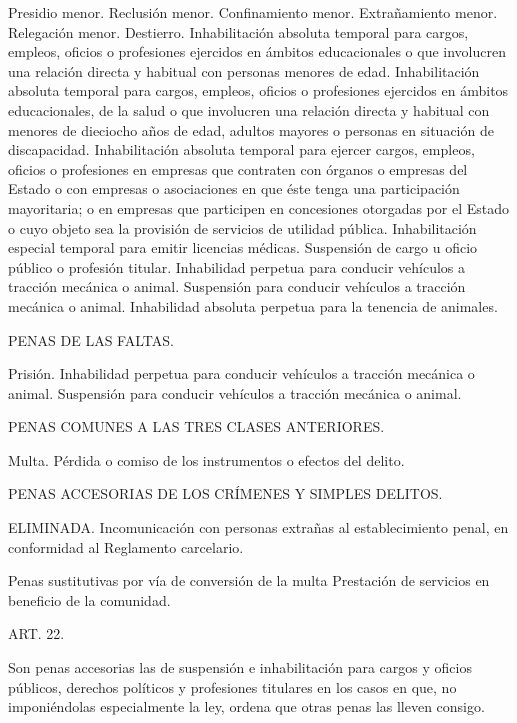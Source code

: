     Presidio menor.
    Reclusión menor.
    Confinamiento menor.
    Extrañamiento menor.
    Relegación menor.
    Destierro.
    Inhabilitación absoluta temporal para cargos, empleos, oficios o profesiones ejercidos en ámbitos educacionales o que involucren una relación directa y habitual con personas menores de edad.
    Inhabilitación absoluta temporal para cargos, empleos, oficios o profesiones ejercidos en ámbitos educacionales, de la salud o que involucren una relación directa y habitual con menores de dieciocho años de edad, adultos mayores o personas en situación de discapacidad.
    Inhabilitación absoluta temporal para ejercer cargos, empleos, oficios o profesiones en empresas que contraten con órganos o empresas del Estado o con empresas o asociaciones en que éste tenga una participación mayoritaria; o en empresas que participen en concesiones otorgadas por el Estado o cuyo objeto sea la provisión de servicios de utilidad pública.
    Inhabilitación especial temporal para emitir licencias médicas.
    Suspensión de cargo u oficio público o profesión titular.
    Inhabilidad perpetua para conducir vehículos a tracción mecánica o animal.
    Suspensión para conducir vehículos a tracción mecánica o animal.
    Inhabilidad absoluta perpetua para la tenencia de animales.

    PENAS DE LAS FALTAS.

    Prisión.
    Inhabilidad perpetua para conducir vehículos a tracción mecánica o animal.
    Suspensión para conducir vehículos a tracción mecánica o animal.

    PENAS COMUNES A LAS TRES CLASES ANTERIORES.

    Multa.
    Pérdida o comiso de los instrumentos o efectos del delito.

    PENAS ACCESORIAS DE LOS CRÍMENES Y SIMPLES DELITOS.

    ELIMINADA.
    Incomunicación con personas extrañas al establecimiento penal, en conformidad al Reglamento carcelario.

    Penas sustitutivas por vía de conversión de la multa
    Prestación de servicios en beneficio de la comunidad.








    ART. 22.

    Son penas accesorias las de suspensión e inhabilitación para cargos y oficios públicos, derechos políticos y profesiones titulares en los casos en que, no imponiéndolas especialmente la ley, ordena que otras penas las lleven consigo.



